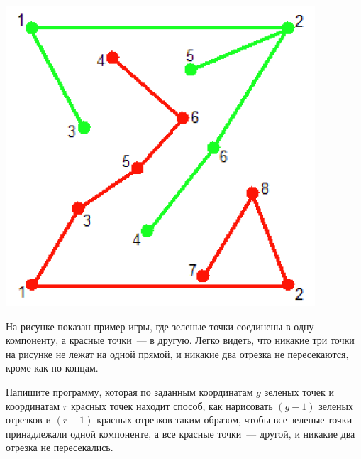 \includegraphics{points.png}

На рисунке показан пример игры, где зеленые точки соединены в одну компоненту, а красные точки~--- в другую. Легко видеть, что никакие три точки на рисунке не
лежат на одной прямой, и никакие два отрезка не пересекаются, кроме как по концам.

Напишите программу, которая по заданным координатам $g$ зеленых точек и координатам $r$
красных точек находит способ, как нарисовать $(g - 1)$ зеленых отрезков и $(r - 1)$ красных отрезков таким образом, чтобы все зеленые точки принадлежали одной компоненте, а все красные точки~--- другой, и никакие два отрезка не пересекались.